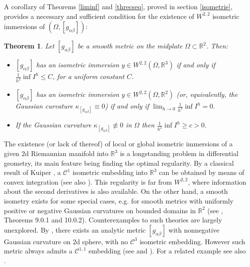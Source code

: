 \documentclass[leqno,twoside, 11pt]{amsart}
\theoremstyle{plain}
\newtheorem{theorem}{Theorem}[section]
\theoremstyle{definition}
\numberwithin{equation}{section}
\numberwithin{figure}{section}
\begin{document}
A corollary of Theorems \ref{liminf} and \ref{threcseq},
proved in section \ref{isometrie}, provides a necessary
and sufficient condition for the existence of $W^{2,2}$ isometric immersions
of $(\Omega, [g_{\alpha\beta}])$:

\begin{theorem}\label{isoim}
Let $[g_{\alpha\beta}]$ be a smooth metric on the midplate
$\Omega\subset\mathbb{R}^2$. Then:
\begin{itemize}
\item[(i)] $[g_{\alpha\beta}]$ has an isometric immersion
$y\in W^{2,2}(\Omega,\mathbb{R}^3)$ if and only if $\frac{1}{h^2}\inf I^h\leq
C$, for a uniform constant $C$.
\item[(ii)] $[g_{\alpha\beta}]$ has an isometric immersion
$y\in W^{2,2}(\Omega,\mathbb{R}^2)$ (or, equivalently,
the Gaussian curvature $\kappa_{[g_{\alpha\beta}]}\equiv 0$)
if and only if $\lim_{h\to 0}\frac{1}{h^2}\inf I^h = 0$.
\item[(iii)] If the Gaussian curvature $\kappa_{[g_{\alpha\beta}]}\not\equiv 0$
in $\Omega$ then $\frac{1}{h^2}\inf I^h \geq c> 0$.
\end{itemize}
\end{theorem}

The existence (or lack of thereof) of local or global isometric
immersions of a given $2$d Riemannian manifold into $\mathbb{R}^3$
is a longstanding problem in differential
geometry, its main feature being finding the optimal regularity.
By a classical result of Kuiper \cite{kuiper},
a $\mathcal{C}^1$ isometric embedding into $\mathbb R^3$  can be 
obtained by means of convex integration (see also \cite{gromov}). 
This regularity is far from $W^{2,2}$, where information about the second
derivatives is also available.
On the other hand, a smooth isometry exists for some special cases, e.g. for
smooth metrics with uniformly positive or negative Gaussian curvatures on bounded
domains in ${\mathbb R^2}$ (see \cite{HH}, Theorems 9.0.1 and 10.0.2).
Counterexamples to such theories are largely unexplored.
By \cite{iaia}, there exists an analytic metric $[g_{\alpha\beta}]$ with
nonnegative Gaussian curvature on $2$d sphere,
with no $\mathcal{C}^3$ isometric embedding. However such metric
always admits a $\mathcal{C}^{1,1}$ embedding (see \cite{GL} and \cite{HZ}).
For a related example see also \cite{pogo}.

\medskip
\end{document}
